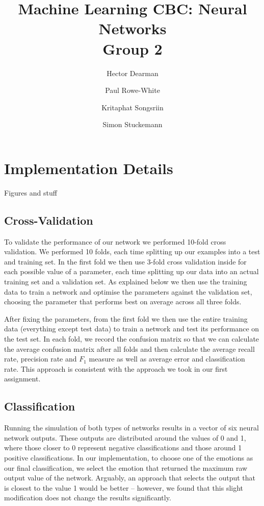 \documentclass[10pt,a4paper]{article}
\author{Hector Dearman \and Paul Rowe-White \and Kritaphat Songsriin \and Simon Stuckemann}
\title{Machine Learning CBC: Neural Networks\\Group 2}
\begin{document}
\maketitle

\section{Implementation Details}
Figures and stuff
\subsection{Cross-Validation}


To validate the performance of our network we performed 10-fold cross validation. We performed 10 folds, each time splitting up our examples into a test and training set. In the first fold we then use 3-fold cross validation inside for each possible value of a parameter, each time splitting up our data into an actual training set and a validation set. As explained below we then use the training data to train a network and optimise the parameters against the validation set, choosing the parameter that performs best on average across all three folds. 

After fixing the parameters, from the first fold we then use the entire training data (everything except test data) to train a network and test its performance on the test set. In each fold, we record the confusion matrix so that we can calculate the average confusion matrix after all folds and then calculate the average recall rate, precision rate and $F_1$ measure as well as average error and classification rate. This approach is consistent with the approach we took in our first assignment.

\subsection{Classification}
Running the simulation of both types of networks results in a vector of six neural network outputs. These outputs are distributed around the values of 0 and 1, where those closer to 0 represent negative classifications and those around 1 positive classifications. In our implementation, to choose one of the emotions as our final classification, we select the emotion that returned the maximum raw output value of the network. Arguably, an approach that selects the output that is closest to the value 1 would be better -- however, we found that this slight modification does not change the results significantly.
\end{document}

